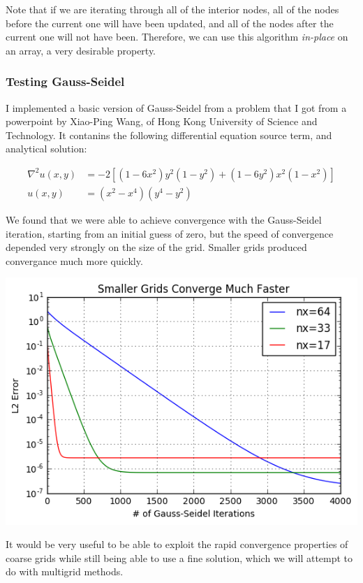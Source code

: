 \documentclass{article}
\begin{document}
Note that if we are iterating through all of the interior nodes,
	all of the nodes before the current one will have been updated,
	and all of the nodes after the current one will not have been.
Therefore, we can use this algorithm \emph{in-place} on an array,
	a very desirable property.

\subsubsection{Testing Gauss-Seidel}

I implemented a basic version of Gauss-Seidel from a problem that I got from
	a powerpoint by Xiao-Ping Wang, of Hong Kong University of Science
	and Technology.
It contanins the following differential equation source term, and analytical solution:

\begin{align}
	\nabla^2 u(x,y) & = -2 \left[ (1 - 6 x^2) y^2 (1-y^2) + (1-6y^2)x^2(1-x^2) \right]\\
	u(x,y) & = (x^2 - x^4)(y^4-y^2)
\end{align}

We found that we were able to achieve convergence with the Gauss-Seidel iteration,
	starting from an initial guess of zero,
	but the speed of convergence depended very strongly on the size of the grid.
Smaller grids produced convergance much more quickly.

\includegraphics[width=\textwidth]{gauss-seidel-error-decreasing}

It would be very useful to be able to exploit the rapid convergence properties
	of coarse grids while still being able to use a fine solution,
	which we will attempt to do with multigrid methods.
\end{document}
